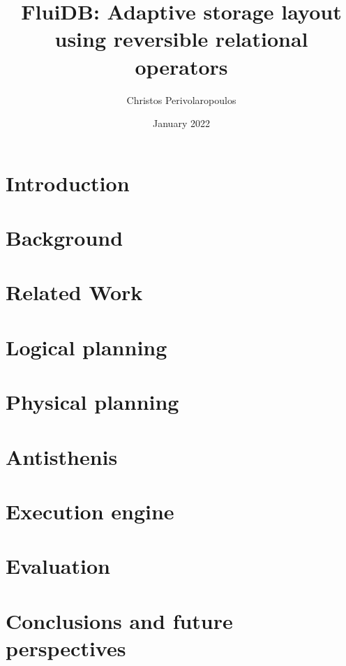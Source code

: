 \documentclass[fontsize=12pt,paper=letter,twosided,cleardoublepage=plain,final]{scrbook}
\title{FluiDB: Adaptive storage layout using reversible relational operators}
\author{Christos Perivolaropoulos}
\date{January 2022}
\begin{document}
\frontmatter


\mainmatter
{}
\chapter{Introduction}
\label{chapter:introduction}


\chapter{Background}
\label{chapter:background}



\chapter{Related Work}
\label{chapter:background}


\chapter{Logical planning}
\label{chapter:fluidb_logical_planning}


\chapter{Physical planning}
\label{chapter:physical_planning}


\chapter{Antisthenis}
\label{chapter:antisthenis}


\chapter{Execution engine}
\label{chapter:execution_engine}


\chapter{Evaluation}
\label{chapter:evaluation}


\chapter{Conclusions and future perspectives}
\label{chapter:conclusion}

\end{document}
